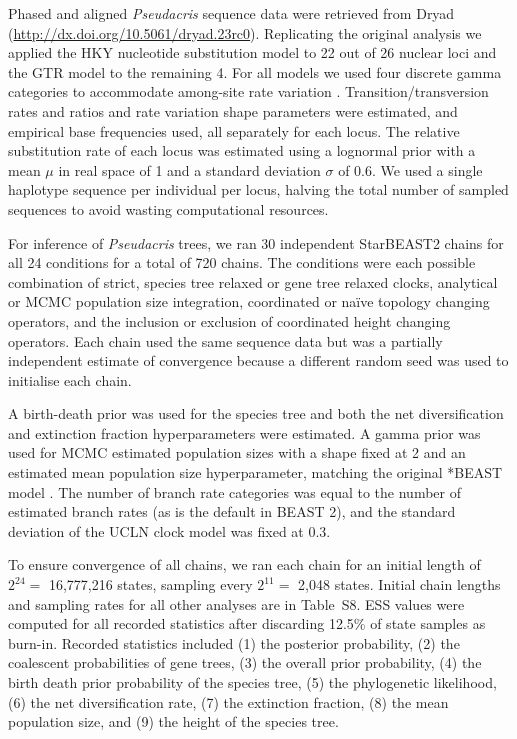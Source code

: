 \documentclass[12pt]{article}
\begin{document}
Phased and aligned \textit{Pseudacris} sequence data were retrieved from Dryad
(\url{http://dx.doi.org/10.5061/dryad.23rc0}). Replicating the original
analysis we applied the HKY nucleotide substitution model \citep{Hasegawa1985}
to 22 out of 26 nuclear loci and the GTR model \citep{Tavare1986} to the
remaining 4. For all models we used four discrete gamma categories to
accommodate among-site rate variation \citep{Yang1994}. Transition/transversion
rates and ratios and rate variation shape parameters were estimated, and
empirical base frequencies used, all separately for each locus. The relative
substitution rate of each locus was estimated using a lognormal prior with a
mean $\mu$ in real space of 1 and a standard deviation $\sigma$ of 0.6. We
used a single haplotype sequence per individual per locus, halving the total
number of sampled sequences to avoid wasting computational resources.

For inference of \textit{Pseudacris} trees, we ran 30 independent StarBEAST2
chains for all 24 conditions for a total of 720 chains. The conditions were
each possible combination of strict, species tree relaxed or gene tree relaxed
clocks, analytical or MCMC population size integration, coordinated or na\"ive
topology changing operators, and the inclusion or exclusion of coordinated
height changing operators. Each chain used the same sequence data but was a
partially independent estimate of convergence because a different random seed
was used to initialise each chain.

A birth-death prior was used for the species tree and both the net
diversification and extinction fraction hyperparameters were estimated. A
gamma prior was used for MCMC estimated population sizes with a shape fixed at
2 and an estimated mean population size hyperparameter, matching the original
*BEAST model \citep{Heled01032010}. The number of branch rate categories was
equal to the number of estimated branch rates (as is the default in BEAST 2),
and the standard deviation of the UCLN clock model was fixed at 0.3.

To ensure convergence of all chains, we ran each chain for an initial length
of $2^{24} =$ 16,777,216 states, sampling every $2^{11} =$ 2,048 states. Initial
chain lengths and sampling rates for all other analyses are in Table~S8. ESS
values were computed for all recorded statistics after discarding 12.5\% of
state samples as burn-in. Recorded statistics included (1) the posterior
probability, (2) the coalescent probabilities of gene trees, (3) the overall
prior probability, (4) the birth death prior probability of the species tree,
(5) the phylogenetic likelihood, (6) the net diversification rate, (7) the
extinction fraction, (8) the mean population size, and (9) the height of the
species tree.
\end{document}
